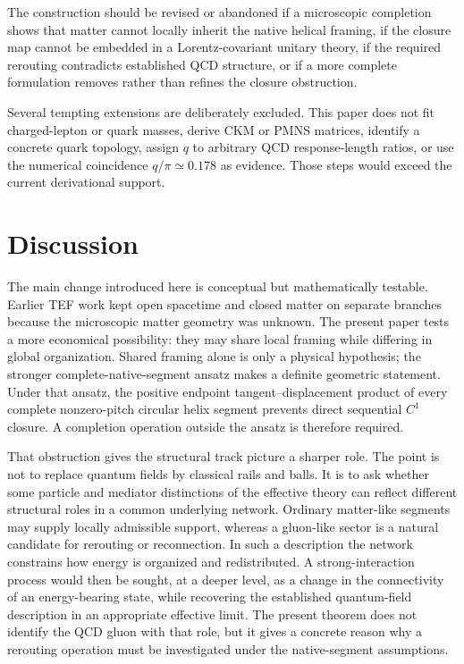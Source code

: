 \documentclass[10pt]{article}
\begin{document}
The construction should be revised or abandoned if a microscopic completion shows that matter cannot locally inherit the native helical framing, if the closure map cannot be embedded in a Lorentz-covariant unitary theory, if the required rerouting contradicts established QCD structure, or if a more complete formulation removes rather than refines the closure obstruction.

Several tempting extensions are deliberately excluded. This paper does not fit charged-lepton or quark masses, derive CKM or PMNS matrices, identify a concrete quark topology, assign $q$ to arbitrary QCD response-length ratios, or use the numerical coincidence $q/\pi\simeq0.178$ as evidence. Those steps would exceed the current derivational support.

\section{Discussion}
\label{sec:discussion}

The main change introduced here is conceptual but mathematically testable. Earlier TEF work kept open spacetime and closed matter on separate branches because the microscopic matter geometry was unknown. The present paper tests a more economical possibility: they may share local framing while differing in global organization. Shared framing alone is only a physical hypothesis; the stronger complete-native-segment ansatz makes a definite geometric statement. Under that ansatz, the positive endpoint tangent--displacement product of every complete nonzero-pitch circular helix segment prevents direct sequential $C^1$ closure. A completion operation outside the ansatz is therefore required.

That obstruction gives the structural track picture a sharper role. The point is not to replace quantum fields by classical rails and balls. It is to ask whether some particle and mediator distinctions of the effective theory can reflect different structural roles in a common underlying network. Ordinary matter-like segments may supply locally admissible support, whereas a gluon-like sector is a natural candidate for rerouting or reconnection. In such a description the network constrains how energy is organized and redistributed. A strong-interaction process would then be sought, at a deeper level, as a change in the connectivity of an energy-bearing state, while recovering the established quantum-field description in an appropriate effective limit. The present theorem does not identify the QCD gluon with that role, but it gives a concrete reason why a rerouting operation must be investigated under the native-segment assumptions.
\end{document}
